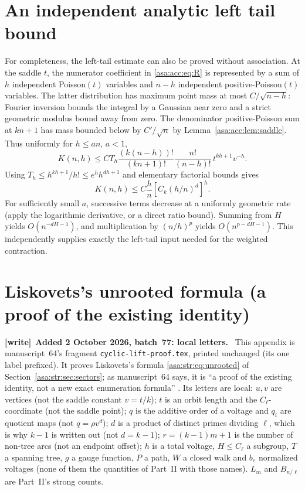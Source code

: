 \documentclass[11pt,letterpaper]{article}
\theoremstyle{remark}\newtheorem{remark}[theorem]{Remark}
\numberwithin{equation}{section}
\newenvironment{writenote}[1][]{\par\smallskip\begingroup\small
 \noindent\textbf{[write]}\if\relax\detokenize{#1}\relax\else~\textbf{#1.}\fi\ }%
 {\par\endgroup\smallskip}
\begin{document}
\appendix
\section{An independent analytic left tail bound}\label{asa:acc:app:left}
For completeness, the left-tail estimate can also be proved without association. At the saddle $t$, the numerator coefficient in \eqref{asa:acc:eq:R} is represented by a sum of $h$ independent Poisson$(t)$ variables and $n-h$ independent positive-Poisson$(t)$ variables. The latter distribution has maximum point mass at most $C/\sqrt{n-h}$: Fourier inversion bounds the integral by a Gaussian near zero and a strict geometric modulus bound away from zero. The denominator positive-Poisson sum at $kn+1$ has mass bounded below by $C'/\sqrt n$ by Lemma~\ref{asa:acc:lem:saddle}. Thus uniformly for $h\le an$, $a<1$,
\[
K(n,h)\le C T_h\frac{(k(n-h))!}{(kn+1)!}
\frac{n!}{(n-h)!}\,t^{kh+1}v^{-h}.
\]
Using $T_h\le h^{kh+1}/h!\le e^h h^{dh+1}$ and elementary factorial bounds gives
\[
K(n,h)\le C\frac hn\left[C_k(h/n)^d\right]^h.
\]
For sufficiently small $a$, successive terms decrease at a uniformly geometric rate (apply the logarithmic derivative, or a direct ratio bound). Summing from $H$ yields $O(n^{-dH-1})$, and multiplication by $(n/h)^p$ yields $O(n^{p-dH-1})$. This independently supplies exactly the left-tail input needed for the weighted contraction.

\section{Liskovets's unrooted formula (a proof of the existing identity)}\label{asa:str:app:cyclic}
\begin{writenote}[Added 2 October 2026, batch~77: local letters]
This appendix is manuscript~64's fragment \texttt{cyclic-\allowbreak lift-\allowbreak proof.tex},
printed unchanged (its one label prefixed). It proves Liskovets's formula
\eqref{asa:str:eq:unrooted} of Section~\ref{asa:str:sec:sectors}; as
manuscript~64 says, it is ``a proof of the existing identity, not a new
exact enumeration formula'' \cite{L71,L98}. Its letters are local: $u,v$ are
vertices (not the saddle constant $v=t/k$); $t$ is an orbit length and the
$C_\ell$-coordinate (not the saddle point); $q$ is the additive order of a
voltage and $q_i$ are quotient maps (not $q=\rho v^d$); $d$ is a product of
distinct primes dividing $\ell$, which is why $k-1$ is written out (not
$d=k-1$); $r=(k-1)m+1$ is the number of non-tree arcs (not an endpoint
offset); $h$ is a total voltage, $H\le C_\ell$ a subgroup, $T$ a spanning
tree, $g$ a gauge function, $P$ a path, $W$ a closed walk and $b_e$
normalized voltages (none of them the quantities of Part~II with those
names). $L_m$ and $B_{n/\ell}$ are Part~II's strong counts.
\end{writenote}
\end{document}
